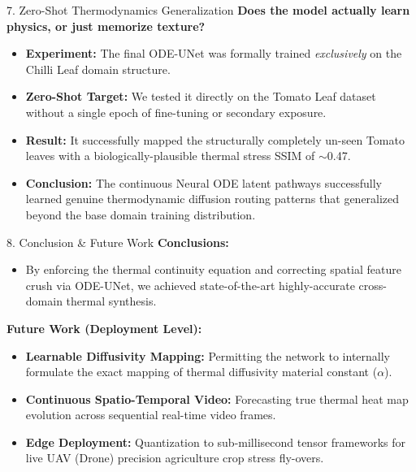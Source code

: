 \documentclass[aspectratio=169]{beamer}
\begin{document}
\begin{frame}{7. Zero-Shot Thermodynamics Generalization}
    \textbf{Does the model actually learn physics, or just memorize texture?}
    \vspace{0.3cm}
    \begin{itemize}
        \item \textbf{Experiment:} The final ODE-UNet was formally trained \textit{exclusively} on the Chilli Leaf domain structure.
        \item \textbf{Zero-Shot Target:} We tested it directly on the Tomato Leaf dataset without a single epoch of fine-tuning or secondary exposure.
        \item \textbf{Result:} It successfully mapped the structurally completely un-seen Tomato leaves with a biologically-plausible thermal stress SSIM of $\sim$0.47.
        \item \textbf{Conclusion:} The continuous Neural ODE latent pathways successfully learned genuine thermodynamic diffusion routing patterns that generalized beyond the base domain training distribution.
    \end{itemize}
\end{frame}

\begin{frame}{8. Conclusion \& Future Work}
    \textbf{Conclusions:}
    \begin{itemize}
        \item By enforcing the thermal continuity equation and correcting spatial feature crush via ODE-UNet, we achieved state-of-the-art highly-accurate cross-domain thermal synthesis.
    \end{itemize}
    \vspace{0.3cm}
    \textbf{Future Work (Deployment Level):}
    \begin{itemize}
        \item \textbf{Learnable Diffusivity Mapping:} Permitting the network to internally formulate the exact mapping of thermal diffusivity material constant ($\alpha$).
        \item \textbf{Continuous Spatio-Temporal Video:} Forecasting true thermal heat map evolution across sequential real-time video frames.
        \item \textbf{Edge Deployment:} Quantization to sub-millisecond tensor frameworks for live UAV (Drone) precision agriculture crop stress fly-overs.
    \end{itemize}
\end{frame}
\end{document}
